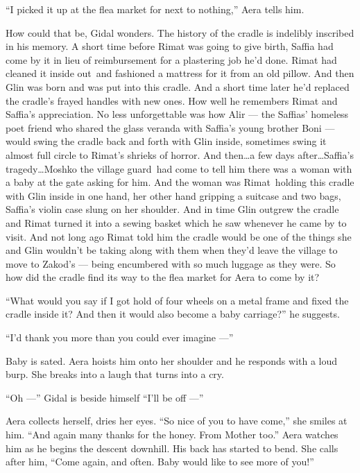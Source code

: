 \documentclass[twoside,11pt]{book}
\begin{document}
``I picked it up at the flea market for next to nothing,'' Aera tells
him{.}

How could that be, Gidal wonders. The history of the cradle is indelibly inscribed in his memory. A short time before
Rimat was going to give birth, Saffia had come by it in lieu of reimbursement for a plastering
job{ }he'd done. Rimat had cleaned it inside out~and fashioned a mattress for
it from an old pillow. And then Glin was born and was put into this cradle. And a short time later he'd replaced
the cradle's frayed handles with new ones. How well he remembers Rimat and Saffia's appreciation. No less unforgettable
was how Alir --- the Saffias{'} homeless poet friend who shared the glass veranda with Saffia's young brother Boni ---
would swing the cradle back and forth with Glin inside, sometimes swing it almost full circle to Rimat's shrieks of
horror. And then{\ldots}a few days after{\ldots}Saffia's tragedy{\ldots}Moshko the village guard~had come to tell him
there was a woman with a baby at the gate asking for him. And the woman was Rimat~holding this cradle with Glin inside
in one hand, her other hand gripping a suitcase and two bags, Saffia's violin case slung on her shoulder. And in time
Glin outgrew the cradle and Rimat turned it into a sewing basket which he saw whenever he came by to visit. And not
long ago Rimat told him the cradle would be one of the things she and Glin wouldn't be taking along with them when
they'd leave the village to move to Zakod's --- being encumbered with so
much luggage as they were. So how did the cradle find its way to the flea market for Aera to come by it?

``What would you say if I got hold of four wheels on a metal frame and fixed the cradle inside it? And then
it would also become a baby carriage?''   he suggests.

``I'd thank you more than you could ever imagine ---''

Baby is sated. Aera hoists him onto her shoulder and he responds with a loud burp. She breaks into a laugh that turns
into a cry.

``Oh ---'' Gidal is beside himself ``I'll be off ---''

Aera collects herself, dries her eyes. ``So nice of you to have come,'' she smiles at him.
``And again many thanks for the honey. From Mother too.'' Aera watches him as he begins the
descent downhill.  His back has started to bend. She calls after him, ``Come again, and often. Baby would
like to see more of you!''
\end{document}
